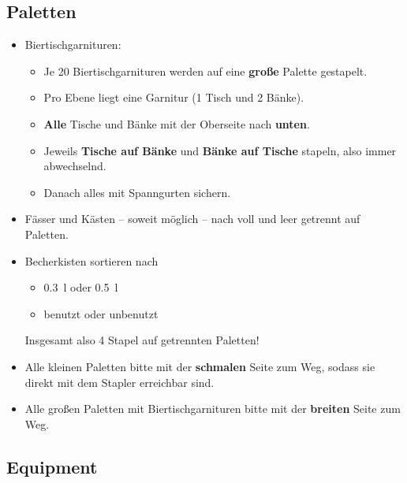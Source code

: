 \subsection{Paletten}
\begin{itemize}
  \item Biertischgarnituren:
    \begin{itemize}
      \item Je 20 Biertischgarnituren werden auf eine \textbf{große} Palette gestapelt.
      \item Pro Ebene liegt eine Garnitur (1 Tisch und 2 Bänke).
      \item \textbf{Alle} Tische und Bänke mit der Oberseite nach \textbf{unten}.
      \item Jeweils \textbf{Tische auf Bänke} und \textbf{Bänke auf Tische} stapeln, also immer abwechselnd.
      \item Danach alles mit Spanngurten sichern. %
    \end{itemize}
  \item Fässer und Kästen -- soweit möglich -- nach voll und leer getrennt auf Paletten.
  \item Becherkisten sortieren nach
    \begin{itemize}
      \item \SI{0.3}{\litre} oder \SI{0.5}{\litre}
      \item benutzt oder unbenutzt
    \end{itemize}
    Insgesamt also 4 Stapel auf getrennten Paletten!
  \item Alle kleinen Paletten bitte mit der \textbf{schmalen} Seite zum Weg, sodass sie direkt mit dem Stapler erreichbar sind.
  \item Alle großen Paletten mit Biertischgarnituren bitte mit der \textbf{breiten} Seite zum Weg.
\end{itemize}
\subsection{Equipment}
